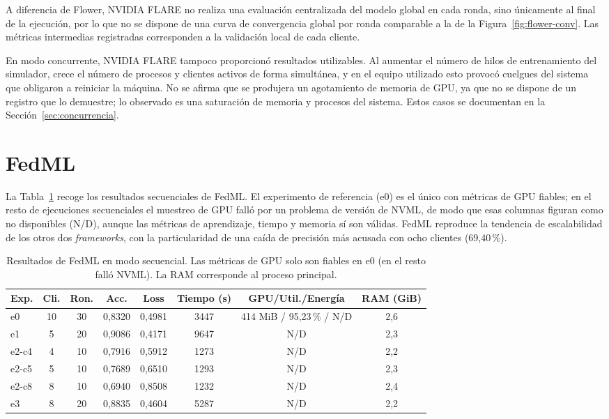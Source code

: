 A diferencia de Flower, NVIDIA FLARE no realiza una evaluación centralizada del modelo global en
cada ronda, sino únicamente al final de la ejecución, por lo que no se dispone de una curva de
convergencia global por ronda comparable a la de la Figura~\ref{fig:flower-conv}. Las métricas
intermedias registradas corresponden a la validación local de cada cliente.

En modo concurrente, NVIDIA FLARE tampoco proporcionó resultados utilizables. Al aumentar el
número de hilos de entrenamiento del simulador, crece el número de procesos y clientes activos
de forma simultánea, y en el equipo utilizado esto provocó cuelgues del sistema que obligaron a
reiniciar la máquina. No se afirma que se produjera un agotamiento de memoria de GPU, ya que no
se dispone de un registro que lo demuestre; lo observado es una saturación de memoria y procesos
del sistema. Estos casos se documentan en la Sección~\ref{sec:concurrencia}.

\section{FedML}\label{sec:resultados-fedml}

La Tabla~\ref{tab:fedml-seq} recoge los resultados secuenciales de FedML. El experimento de
referencia (e0) es el único con métricas de GPU fiables; en el resto de ejecuciones secuenciales
el muestreo de GPU falló por un problema de versión de NVML, de modo que esas columnas figuran
como no disponibles (N/D), aunque las métricas de aprendizaje, tiempo y memoria sí son válidas.
FedML reproduce la tendencia de escalabilidad de los otros dos \textit{frameworks}, con la
particularidad de una caída de precisión más acusada con ocho clientes (69{,}40\,\%).

\begin{table}[htbp]
  \centering
  \footnotesize
  \setlength{\tabcolsep}{4pt}
  \caption{Resultados de FedML en modo secuencial. Las métricas de GPU solo son fiables en e0
  (en el resto falló NVML). La RAM corresponde al proceso principal.}
  \label{tab:fedml-seq}
  \begin{tabular}{lccccccc}
    \toprule
    Exp. & Cli. & Ron. & Acc. & Loss & Tiempo (s) & GPU/Util./Energía & RAM (GiB) \\
    \midrule
    e0    & 10 & 30 & 0,8320 & 0,4981 & 3447 & 414 MiB / 95,23\,\% / N/D & 2,6 \\
    e1    & 5  & 20 & 0,9086 & 0,4171 & 9647 & N/D & 2,3 \\
    e2-c4 & 4  & 10 & 0,7916 & 0,5912 & 1273 & N/D & 2,2 \\
    e2-c5 & 5  & 10 & 0,7689 & 0,6510 & 1293 & N/D & 2,3 \\
    e2-c8 & 8  & 10 & 0,6940 & 0,8508 & 1232 & N/D & 2,4 \\
    e3    & 8  & 20 & 0,8835 & 0,4604 & 5287 & N/D & 2,2 \\
    \bottomrule
  \end{tabular}
\end{table}

